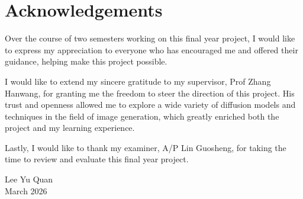 \documentclass[12pt,a4paper]{report}
\begin{document}
\setcounter{page}{2}

{}
\section*{Acknowledgements}

Over the course of two semesters working on this final year project, I would like to express my appreciation to everyone who has encouraged me and offered their guidance, helping make this project possible.

I would like to extend my sincere gratitude to my supervisor, Prof Zhang Hanwang, for granting me the freedom to steer the direction of this project. His trust and openness allowed me to explore a wide variety of diffusion models and techniques in the field of image generation, which greatly enriched both the project and my learning experience.

Lastly, I would like to thank my examiner, A/P Lin Guosheng, for taking the time to review and evaluate this final year project.

\vspace{1cm}
\noindent Lee Yu Quan\\
March 2026

\newpage

\tableofcontents
\newpage

{}
\listoffigures
\newpage

{}
\listoftables
\newpage

\setcounter{page}{1}

\end{document}
